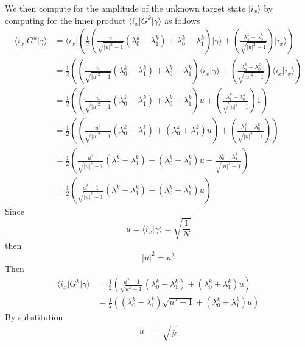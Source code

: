 We then compute for the amplitude of the unknown target state $\vert i_{x} \rangle$ by computing for the inner product $\langle i_{x} \vert G^{k} \vert \gamma \rangle$ as follows
\begin{align}
\langle i_{x} \vert G^{k} \vert \gamma \rangle &= \langle i_{x}  \vert
\left( \frac{1}{2} 
\left(\frac{u}{\sqrt{\vert u \vert^2 - 1}}\left(\lambda_0^k - \lambda_1^k \right) + \lambda_0^k + \lambda_1^k\right) \vert \gamma \rangle + 
\left(\frac{\lambda_1^k - \lambda_0^k}{\sqrt{\vert u \vert^2 - 1}}\right) \vert i_{x} \rangle
\right)\\
&= \frac{1}{2} 
\left(
\left(\frac{u}{\sqrt{\vert u \vert^2 - 1}}\left(\lambda_0^k - \lambda_1^k \right) + \lambda_0^k + \lambda_1^k\right) \langle i_{x} \vert \gamma \rangle + 
\left(\frac{\lambda_1^k - \lambda_0^k}{\sqrt{\vert u \vert^2 - 1}}\right) \langle i_{x} \vert i_{x} \rangle
\right)\\
&= \frac{1}{2} 
\left(
\left(\frac{u}{\sqrt{\vert u \vert^2 - 1}}\left(\lambda_0^k - \lambda_1^k \right) + \lambda_0^k + \lambda_1^k\right) u + 
\left(\frac{\lambda_1^k - \lambda_0^k}{\sqrt{\vert u \vert^2 - 1}}\right) 1
\right)\\
&= \frac{1}{2} 
\left(
\left(\frac{u^2}{\sqrt{\vert u \vert^2 - 1}}\left(\lambda_0^k - \lambda_1^k \right) + \left(\lambda_0^k + \lambda_1^k\right) u \right) + 
\left(\frac{\lambda_1^k - \lambda_0^k}{\sqrt{\vert u \vert^2 - 1}}\right)
\right)\\
&= \frac{1}{2} 
\left(
\frac{u^2}{\sqrt{\vert u \vert^2 - 1}}\left(\lambda_0^k - \lambda_1^k \right) + \left(\lambda_0^k + \lambda_1^k\right) u  - 
\frac{\lambda_0^k - \lambda_1^k}{\sqrt{\vert u \vert^2 - 1}}
\right)\\
&= \frac{1}{2} 
\left(
\frac{u^2 - 1}{\sqrt{\vert u \vert^2 - 1}}\left(\lambda_0^k - \lambda_1^k \right) + \left(\lambda_0^k + \lambda_1^k\right) u
\right)
\end{align}
Since 
\[
u = \langle i_{x} \vert \gamma \rangle = \sqrt{\frac{1}{N}}
\]
then
\[
\vert u \vert^2 = u^2
\]
Then
\begin{align}
\langle i_{x} \vert G^{k} \vert \gamma \rangle &=
\frac{1}{2} 
\left(
\frac{u^2 - 1}{\sqrt{u^2 - 1}}\left(\lambda_0^k - \lambda_1^k \right) + \left(\lambda_0^k + \lambda_1^k\right)u
\right)\\
&=
\frac{1}{2} 
\left(
\left(\lambda_0^k - \lambda_1^k \right)\sqrt{u^2 - 1} + \left(\lambda_0^k + \lambda_1^k\right)u
\right)
\end{align}
By substitution
\begin{align}
u &= \sqrt{\frac{1}{N}}
\end{align}
